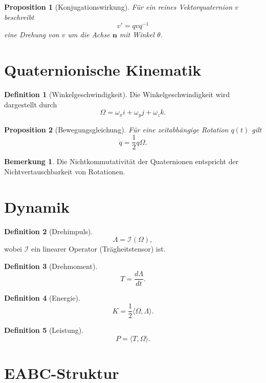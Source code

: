 \documentclass[11pt]{article}
\theoremstyle{definition}
\newtheorem{definition}{Definition}
\newtheorem{remark}{Bemerkung}
\theoremstyle{plain}
\newtheorem{proposition}{Proposition}
\begin{document}
	\begin{proposition}[Konjugationswirkung]
		Für ein reines Vektorquaternion $v$ beschreibt
		\[
		v' = q v q^{-1}
		\]
		eine Drehung von $v$ um die Achse $\mathbf n$ mit Winkel $\theta$.
	\end{proposition}
	
	\section{Quaternionische Kinematik}
	
	\begin{definition}[Winkelgeschwindigkeit]
		Die Winkelgeschwindigkeit wird dargestellt durch
		\[
		\Omega = \omega_x i + \omega_y j + \omega_z k.
		\]
	\end{definition}
	
	\begin{proposition}[Bewegungsgleichung]
		Für eine zeitabhängige Rotation $q(t)$ gilt
		\[
		\dot q = \frac12 q \Omega.
		\]
	\end{proposition}
	
	\begin{remark}
		Die Nichtkommutativität der Quaternionen entspricht der Nichtvertauschbarkeit von Rotationen.
	\end{remark}
	
	\section{Dynamik}
	
	\begin{definition}[Drehimpuls]
		\[
		\Lambda = \mathcal I(\Omega),
		\]
		wobei $\mathcal I$ ein linearer Operator (Trägheitstensor) ist.
	\end{definition}
	
	\begin{definition}[Drehmoment]
		\[
		T = \frac{d\Lambda}{dt}.
		\]
	\end{definition}
	
	\begin{definition}[Energie]
		\[
		K = \frac12 \langle \Omega, \Lambda \rangle.
		\]
	\end{definition}
	
	\begin{definition}[Leistung]
		\[
		P = \langle T, \Omega \rangle.
		\]
	\end{definition}
	
	\section{EABC-Struktur}
	
\end{document}
